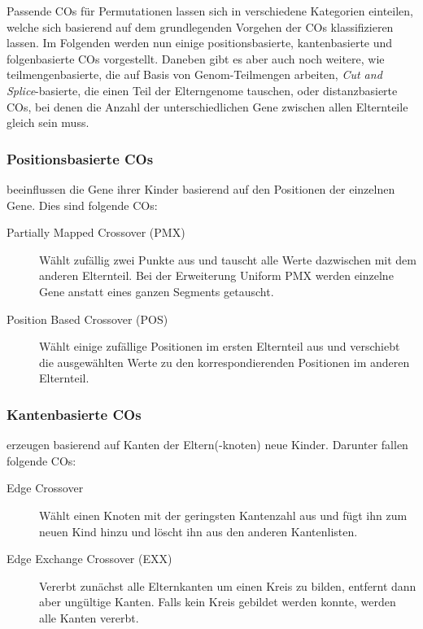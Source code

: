 	Passende COs für Permutationen lassen sich in verschiedene Kategorien einteilen, welche sich basierend auf dem grundlegenden Vorgehen der COs klassifizieren lassen. Im Folgenden werden nun einige positionsbasierte, kantenbasierte und folgenbasierte COs vorgestellt. Daneben gibt es aber auch noch weitere, wie \zB teilmengenbasierte, die auf Basis von Genom-Teilmengen arbeiten, \textit{Cut and Splice}-basierte, die einen Teil der Elterngenome tauschen, oder distanzbasierte COs, bei denen die Anzahl der unterschiedlichen Gene zwischen allen Elternteile gleich sein muss.
	
	\subsubsection{Positionsbasierte COs}
	
		beeinflussen die Gene ihrer Kinder basierend auf den Positionen der einzelnen Gene. Dies sind \uA folgende COs:
		
		\begin{description}
			\item[Partially Mapped Crossover (PMX)] Wählt zufällig zwei Punkte aus und tauscht alle Werte dazwischen mit dem anderen Elternteil. Bei der Er\-wei\-ter\-ung Uniform PMX werden einzelne Gene anstatt eines ganzen Segments getauscht. \cite{GAforTSP}\cite{COforPermutations}\cite{COforQAP}
			\item[Position Based Crossover (POS)] Wählt einige zufällige Positionen im ersten Elternteil aus und verschiebt die ausgewählten Werte zu den korrespondierenden Positionen im anderen Elternteil. \cite{COforPermutations}
		\end{description}
		
	\subsubsection{Kantenbasierte COs}
	
		erzeugen basierend auf Kanten der Eltern(-knoten) neue Kinder. Darunter fallen \uA folgende COs:
		
		\begin{description}
			\item[Edge Crossover] Wählt einen Knoten mit der geringsten Kantenzahl aus und fügt ihn zum neuen Kind hinzu und löscht ihn aus den anderen Kantenlisten. \cite{COforPermutations}
			\item[Edge Exchange Crossover (EXX)] Vererbt zunächst alle Elternkanten um einen Kreis zu bilden, entfernt dann aber ungültige Kanten. Falls kein Kreis gebildet werden konnte, werden alle Kanten vererbt. \cite{EdgeCOforTSP}
		\end{description}
	
